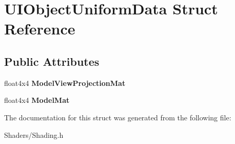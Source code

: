 \hypertarget{structUIObjectUniformData}{}\section{U\+I\+Object\+Uniform\+Data Struct Reference}
\label{structUIObjectUniformData}
\subsection*{Public Attributes}
\begin{DoxyCompactItemize}
\item 
\mbox{\label{structUIObjectUniformData_a7d1cf94cad92bf39d5abb56348c4461c}} 
float4x4 {\bfseries Model\+View\+Projection\+Mat}
\item 
\mbox{\label{structUIObjectUniformData_a3ca6e0bd3b807a4a3948a81a51627701}} 
float4x4 {\bfseries Model\+Mat}
\end{DoxyCompactItemize}


The documentation for this struct was generated from the following file\+:\begin{DoxyCompactItemize}
\item 
Shaders/Shading.\+h\end{DoxyCompactItemize}
